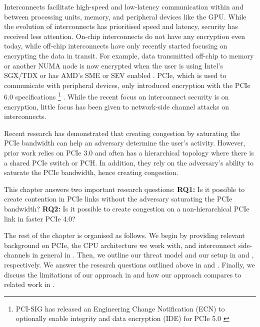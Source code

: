 
Interconnects facilitate high-speed and low-latency communication within and between processing units, memory, and peripheral devices like the GPU.
While the evolution of interconnects has prioritised speed and latency, security has received less attention.
On-chip interconnects do not have any encryption even today, while off-chip interconnects have only recently started focusing on encrypting the data in transit.
For example, data transmitted off-chip to memory or another NUMA node is now encrypted when the user is using Intel's SGX/TDX or has AMD's SME or SEV enabled \cite{intel_upi_encryption, amd_gen_5_arch}.
PCIe, which is used to communicate with peripheral devices, only introduced encryption with the PCIe 6.0 specifications 
\footnote{PCI-SIG has released an Engineering Change Notification (ECN) to optionally enable integrity and data encryption (IDE) for PCIe 5.0 \cite{pcie_ide_v5_ecn}}
\cite{pcie_ide_v6}.
While the recent focus on interconnect security is on encryption, little focus has been given to network-side channel attacks on interconnects.

Recent research has demonstrated that creating congestion by saturating the PCIe bandwidth can help an adversary determine the user's activity.
However, prior work relies on PCIe 3.0 and often has a hierarchical topology where there is a shared PCIe switch or PCH.
In addition, they rely on the adversary's ability to saturate the PCIe bandwidth, hence creating congestion.

This chapter answers two important research questions:
\textbf{RQ1:} Is it possible to create contention in PCIe links without the adversary saturating the PCIe bandwidth?
\textbf{RQ2:} Is it possible to create congestion on a non-hierarchical PCIe link in faster PCIe 4.0?

The rest of the chapter is organised as follows.
We begin by providing relevant background on PCIe, the CPU architecture we work with, and interconnect side-channels in general in . 
Then, we outline our threat model and our setup in  and , respectively.
We answer the research questions outlined above in  and .
Finally, we discuss the limitations of our approach in  and how our approach compares to related work in .

